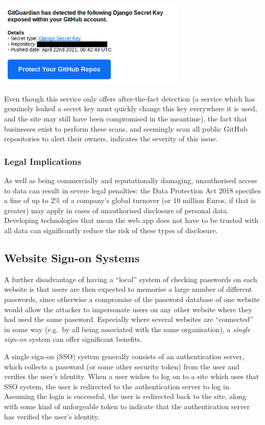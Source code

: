 \documentclass{article}
\begin{document}
\includegraphics[width=9cm]{01-gitguardian.png}

Even though this service only offers after-the-fact detection (a service which has genuinely leaked a secret key must quickly change this key everywhere it is used, and the site may still have been compromised in the meantime), the fact that businesses exist to perform these scans, and seemingly scan all public GitHub repositories to alert their owners, indicates the severity of this issue.

\subsubsection{Legal Implications}
As well as being commercially and reputationally damaging, unauthorised access to data can result in severe legal penalties: the Data Protection Act 2018 specifies a fine of up to 2\% of a company's global turnover (or 10 million Euros, if that is greater) may apply in cases of unauthorised disclosure of personal data\cite{GDPR}. Developing technologies that mean the web app does not have to be trusted with all data can significantly reduce the risk of these types of disclosure.

\subsection{Website Sign-on Systems}
A further disadvantage of having a ``local'' system of checking passwords on each website is that users are then expected to memorise a large number of different passwords, since otherwise a compromise of the password database of one website would allow the attacker to impersonate users on any other website where they had used the same password. Especially where several websites are ``connected'' in some way (e.g.\ by all being associated with the same organisation), a \textit{single sign-on} system can offer significant benefits.

A single sign-on (SSO) system generally consists of an authentication server, which collects a password (or some other security token) from the user and verifies the user's identity. When a user wishes to log on to a site which uses that SSO system, the user is redirected to the authentication server to log in. Assuming the login is successful, the user is redirected back to the site, along with some kind of unforgeable token to indicate that the authentication server has verified the user's identity.
\end{document}
